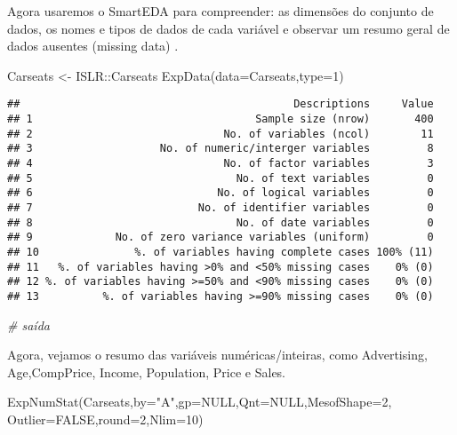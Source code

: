 \documentclass[
]{article}
\newenvironment{Shaded}{\begin{snugshade}}{\end{snugshade}}
\newcommand{\AttributeTok}[1]{\textcolor[rgb]{0.77,0.63,0.00}{#1}}
\newcommand{\CommentTok}[1]{\textcolor[rgb]{0.56,0.35,0.01}{\textit{#1}}}
\newcommand{\ConstantTok}[1]{\textcolor[rgb]{0.00,0.00,0.00}{#1}}
\newcommand{\DecValTok}[1]{\textcolor[rgb]{0.00,0.00,0.81}{#1}}
\newcommand{\FunctionTok}[1]{\textcolor[rgb]{0.00,0.00,0.00}{#1}}
\newcommand{\NormalTok}[1]{#1}
\newcommand{\OtherTok}[1]{\textcolor[rgb]{0.56,0.35,0.01}{#1}}
\newcommand{\SpecialCharTok}[1]{\textcolor[rgb]{0.00,0.00,0.00}{#1}}
\newcommand{\StringTok}[1]{\textcolor[rgb]{0.31,0.60,0.02}{#1}}
\begin{document}
Agora usaremos o SmartEDA para compreender: as dimensões do conjunto de
dados, os nomes e tipos de dados de cada variável e observar um resumo
geral de dados ausentes (missing data) .

\begin{Shaded}
\begin{Highlighting}[]
\NormalTok{Carseats }\OtherTok{\textless{}{-}}\NormalTok{ ISLR}\SpecialCharTok{::}\NormalTok{Carseats}
\FunctionTok{ExpData}\NormalTok{(}\AttributeTok{data=}\NormalTok{Carseats,}\AttributeTok{type=}\DecValTok{1}\NormalTok{)}
\end{Highlighting}
\end{Shaded}

\begin{verbatim}
##                                           Descriptions     Value
## 1                                   Sample size (nrow)       400
## 2                              No. of variables (ncol)        11
## 3                    No. of numeric/interger variables         8
## 4                              No. of factor variables         3
## 5                                No. of text variables         0
## 6                             No. of logical variables         0
## 7                          No. of identifier variables         0
## 8                                No. of date variables         0
## 9             No. of zero variance variables (uniform)         0
## 10               %. of variables having complete cases 100% (11)
## 11   %. of variables having >0% and <50% missing cases    0% (0)
## 12 %. of variables having >=50% and <90% missing cases    0% (0)
## 13          %. of variables having >=90% missing cases    0% (0)
\end{verbatim}

\begin{Shaded}
\begin{Highlighting}[]
\CommentTok{\# saída}
\end{Highlighting}
\end{Shaded}

Agora, vejamos o resumo das variáveis numéricas/inteiras, como
Advertising, Age,CompPrice, Income, Population, Price e Sales.

\begin{Shaded}
\begin{Highlighting}[]
\FunctionTok{ExpNumStat}\NormalTok{(Carseats,}\AttributeTok{by=}\StringTok{"A"}\NormalTok{,}\AttributeTok{gp=}\ConstantTok{NULL}\NormalTok{,}\AttributeTok{Qnt=}\ConstantTok{NULL}\NormalTok{,}\AttributeTok{MesofShape=}\DecValTok{2}\NormalTok{, }\AttributeTok{Outlier=}\ConstantTok{FALSE}\NormalTok{,}\AttributeTok{round=}\DecValTok{2}\NormalTok{,}\AttributeTok{Nlim=}\DecValTok{10}\NormalTok{)}
\end{Highlighting}
\end{Shaded}
\end{document}
